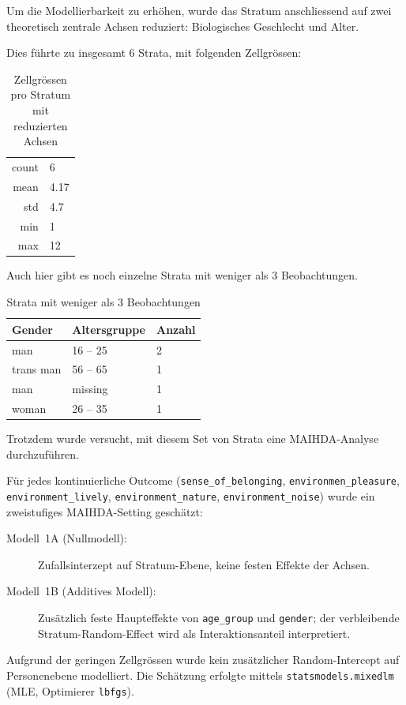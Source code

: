 Um die Modellierbarkeit zu erhöhen, wurde das Stratum anschliessend auf zwei theoretisch zentrale Achsen reduziert: Biologisches Geschlecht und Alter.

Dies führte zu insgesamt $6$ Strata, mit folgenden Zellgrössen:

\begin{table}[h]
    \centering
    \begin{tabular}{rl}
        count & 6 \\
        mean & 4.17 \\
        std & 4.7 \\
        min & 1 \\
        max & 12 \\
    \end{tabular}
    \caption{Zellgrössen pro Stratum mit reduzierten Achsen}
    \label{tab:zellgroessen_reduzierte_achsen}
\end{table}

Auch hier gibt es noch einzelne Strata mit weniger als 3 Beobachtungen.

\begin{table}[h]
    \centering
    \begin{tabular}{lll}
        Gender & Altersgruppe & Anzahl \\
        \hline
        man & 16 – 25 & 2 \\
        trans man & 56 – 65 & 1 \\
        man & missing & 1 \\
        woman & 26 – 35 & 1 \\
    \end{tabular}
    \caption{Strata mit weniger als 3 Beobachtungen}
    \label{tab:zellgroessen_reduzierte_achsen}
\end{table}

Trotzdem wurde versucht, mit diesem Set von Strata eine MAIHDA-Analyse durchzuführen.

Für jedes kontinuierliche Outcome (\texttt{sense\_of\_belonging}, \texttt{environmen\_pleasure}, \texttt{environment\_lively}, \texttt{environment\_nature}, \texttt{environment\_noise}) wurde ein zweistufiges MAIHDA-Setting geschätzt:
\begin{description}
    \item[Modell~1A (Nullmodell):] Zufallsinterzept auf Stratum-Ebene, keine festen Effekte der Achsen.
    \item[Modell~1B (Additives Modell):] Zusätzlich feste Haupteffekte von \texttt{age\_group} und \texttt{gender}; der verbleibende Stratum-Random-Effect wird als Interaktionsanteil interpretiert.
\end{description}
Aufgrund der geringen Zellgrössen wurde kein zusätzlicher Random-Intercept auf Personenebene modelliert. Die Schätzung erfolgte mittels \texttt{statsmodels.mixedlm} (MLE, Optimierer \texttt{lbfgs}).


